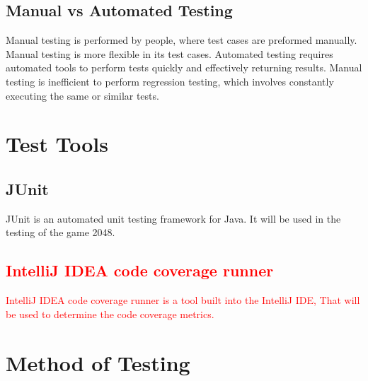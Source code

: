 \documentclass[12pt]{article}
\begin{document}
\subsection{Manual vs Automated Testing}
Manual testing is performed by people, where test cases are preformed manually.
Manual testing is more flexible in its test cases. Automated testing
requires automated tools to perform tests quickly and effectively returning
results. Manual testing is inefficient to perform regression testing, which
involves constantly executing the same or similar tests.

\section{Test Tools}

\subsection{JUnit}
JUnit is an automated unit testing framework for Java. It will be used in the
testing of the game 2048.

\subsection{\textcolor{red}{IntelliJ IDEA code coverage runner}}
\textcolor{red}{IntelliJ IDEA code coverage runner is a tool built into the IntelliJ IDE, That will be used to determine the code coverage metrics.}

\section{Method of Testing}
\end{document}
